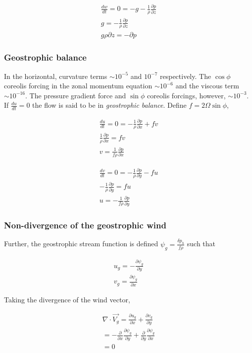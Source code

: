 \documentclass[a4paper,12pt]{article}
\begin{document}
\begin{align}
\frac{dw}{dt} = 0 = -g - \frac{1}{\rho}\frac{\partial p}{\partial z}\\
g = -\frac{1}{\rho}\frac{\partial p}{\partial z}\\
\boxed{g\rho\partial z = -\partial p}
\end{align}

\subsubsection*{Geostrophic balance}
In the horizontal, curvature terms $\sim 10^{-5}$ and $10^{-7}$ respectively. The $\cos\phi$ coreolis forcing in the zonal momentum equation $\sim 10^{-6}$ and the viscous term $\sim 10^{-16}$. The pressure gradient force and $\sin\phi$ coreolis forcings, however, $\sim 10^{-3}$. If $\frac{du}{dt} = 0$ the flow is said to be in \emph{geostrophic balance}.
Define $ f = 2\Omega\sin\phi$,

\begin{align}
\frac{du}{dt} = 0 = -\frac{1}{\rho}\frac{\partial p}{\partial x}+ fv\\
\frac{1}{\rho}\frac{\partial p}{\partial x} = fv\\
\boxed{v = \frac{1}{f\rho}\frac{\partial p}{\partial x}}
\end{align}

\begin{align}
\frac{dv}{dt} = 0 = -\frac{1}{\rho}\frac{\partial p}{\partial y} - fu\\
-\frac{1}{\rho}\frac{\partial p}{\partial y} = fu\\
\boxed{u = -\frac{1}{f\rho}\frac{\partial p}{\partial y}}
\end{align}

\subsubsection*{Non-divergence of the geostrophic wind}
Further, the geostrophic stream function is defined $\psi_g = \frac{\delta p_{h}}{f\rho}$ such that

\begin{align}
u_g = -\frac{\partial\psi_g}{\partial y}\\
v_g = \frac{\partial\psi_g}{\partial x}
\end{align}

Taking the divergence of the wind vector,

\begin{align}
\nabla \cdot \vec{V_g} = \frac{\partial u_g}{\partial x} + \frac{\partial v_g}{\partial y}\\
= -\frac{\partial}{\partial x}\frac{\partial \psi_g}{\partial y} + \frac{\partial}{\partial y}\frac{\partial \psi_g}{\partial x}\\
= 0
\end{align}
\end{document}
